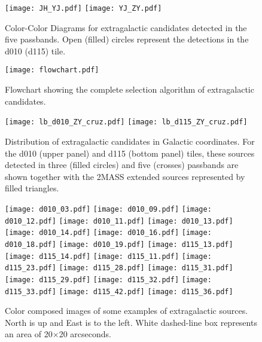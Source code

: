 \documentclass[preprint2]{aastex}
\begin{document}
\begin{figure*}
\begin{centering}
  \texttt{[image: JH\_YJ.pdf]}
  \texttt{[image: YJ\_ZY.pdf]}
  \caption{Color-Color Diagrams for extragalactic candidates detected in
    the five passbands.  Open (filled) circles represent the detections in the d010 (d115) tile. }
            \label{color2}
\end{centering}
\end{figure*}

\begin{figure*}
\begin{centering}
            \texttt{[image: flowchart.pdf]}
          \caption{Flowchart showing the complete selection algorithm of
            extragalactic candidates.}
            \label{flowchart}
\end{centering}
\end{figure*}

\begin{figure*}
\begin{centering}
  \texttt{[image: lb\_d010\_ZY\_cruz.pdf]}
  \texttt{[image: lb\_d115\_ZY\_cruz.pdf]}
  \caption{Distribution of extragalactic candidates in Galactic coordinates. For the d010 (upper panel) and d115 (bottom panel) tiles,
    these sources detected in three (filled circles)
    and five (crosses) passbands are shown together with the 2MASS extended
    sources
    represented by filled triangles. }
	\label{lbvvv}
\end{centering}
\end{figure*}

 \begin{figure*}
\begin{centering}
    \texttt{[image: d010\_03.pdf]}
    \texttt{[image: d010\_09.pdf]}
    \texttt{[image: d010\_12.pdf]}
    \texttt{[image: d010\_11.pdf]}
    \texttt{[image: d010\_13.pdf]}
    \texttt{[image: d010\_14.pdf]}
    \texttt{[image: d010\_16.pdf]}
    \texttt{[image: d010\_18.pdf]}
    \texttt{[image: d010\_19.pdf]}
    \texttt{[image: d115\_13.pdf]}
    \texttt{[image: d115\_14.pdf]}
    \texttt{[image: d115\_11.pdf]}
    \texttt{[image: d115\_23.pdf]}
    \texttt{[image: d115\_28.pdf]}
    \texttt{[image: d115\_31.pdf]}
    \texttt{[image: d115\_29.pdf]}
    \texttt{[image: d115\_32.pdf]}
    \texttt{[image: d115\_33.pdf]}    
    \texttt{[image: d115\_42.pdf]}
    \texttt{[image: d115\_36.pdf]}
    \caption{Color composed images of some examples of extragalactic sources.
    North is up and East is to the left.  White 
dashed-line box represents an area of 20$\times$20 arcseconds. }
\label{rgbd115}       
\end{centering}
\end{figure*}
\end{document}
